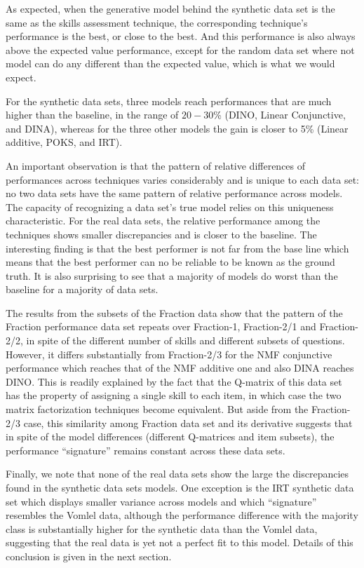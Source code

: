 As expected, when the generative model behind the synthetic data set is the same as the skills assessment technique, the corresponding technique's performance is the best, or close to the best.  And this performance is also always above the expected value performance, except for the random data set where not model can do any different than the expected value, which is what we would expect.

For the synthetic data sets, three models reach performances that are much higher than the baseline, in the range of $20-30$\% (DINO, Linear Conjunctive, and DINA), whereas for the three other models the gain is closer to 5\% (Linear additive, POKS, and IRT).

An important observation is that the pattern of relative differences of performances across techniques varies considerably and is unique to each data set: no two data sets have the same pattern of relative performance across models.  The capacity of recognizing a data set's true model relies on this uniqueness characteristic.
For the real data sets, the relative performance among the techniques shows smaller discrepancies and is closer to the baseline. The interesting finding is that the best performer is not far from the base line which means that the best performer can no be reliable to be known as the ground truth. It is also surprising to see that a majority of models do worst than the baseline for a majority of data sets. 

The results from the subsets of the Fraction data show that the pattern of the Fraction performance data set repeats over Fraction-1, Fraction-2/1 and Fraction-2/2, in spite of the different number of skills and different subsets of questions.  However, it differs substantially from Fraction-2/3 for the NMF conjunctive performance which reaches that of the NMF additive one and also DINA reaches DINO. This is readily explained by the fact that the Q-matrix of this data set has the property of assigning a single skill to each item, in which case the two matrix factorization techniques become equivalent.  But aside from the Fraction-2/3 case, this similarity among Fraction data set and its derivative suggests that in spite of the model differences (different Q-matrices and item subsets), the performance ``signature'' remains constant across these data sets.

Finally, we note that none of the real data sets show the large the discrepancies found in the synthetic data sets models. One exception is the IRT synthetic data set which displays smaller variance across models and which ``signature'' resembles the Vomlel data, although the performance difference with the majority class is substantially higher for the synthetic data than the Vomlel data, suggesting that the real data is yet not a perfect fit to this model. Details of this conclusion is given in the next section.


